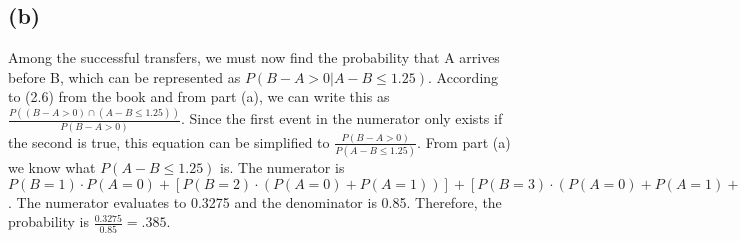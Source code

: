 \documentclass{article}
\begin{document}
\subsection*{(b)}

Among the successful transfers, we must now find the probability that A arrives
before B, which can be represented as $P( B - A > 0 \vert A - B \leq 1.25 )$.
According to (2.6) from the book and from part (a), we can write this as
$\frac{ P( (B - A > 0) \cap (A - B \leq 1.25) ) }{ P( B - A > 0 ) }$. Since the
first event in the numerator only exists if the second is true, this equation
can be simplified to $\frac{ P( B - A > 0 ) }{ P( A - B \leq 1.25 ) }$. From
part (a) we know what $P( A - B \leq 1.25 )$ is. The numerator is $P(B = 1)
\cdot P(A = 0) + [P(B = 2)\cdot (P(A = 0) + P(A = 1))] + [P(B = 3) \cdot (P(A=0) +
P(A=1) + P(A=2))]$. The numerator evaluates to 0.3275 and the denominator is
0.85. Therefore, the probability is $\frac{0.3275}{0.85} = .385$.
\end{document}
